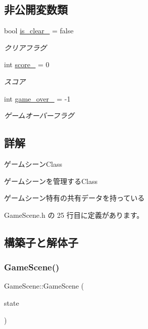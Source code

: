 \subsection*{非公開変数類}
\begin{DoxyCompactItemize}
\item 
bool \mbox{\hyperlink{class_game_scene_a48cf67b81c80718df80ee03aa6e73e74}{is\+\_\+clear\+\_\+}} = false
\begin{DoxyCompactList}\small\item\em クリアフラグ \end{DoxyCompactList}\item 
int \mbox{\hyperlink{class_game_scene_afe49ee089b9ad8415f7ab432a3c554aa}{score\+\_\+}} = 0
\begin{DoxyCompactList}\small\item\em スコア \end{DoxyCompactList}\item 
int \mbox{\hyperlink{class_game_scene_a92b5476dc1536c43b604bef51cc36c70}{game\+\_\+over\+\_\+}} = -\/1
\begin{DoxyCompactList}\small\item\em ゲームオーバーフラグ \end{DoxyCompactList}\end{DoxyCompactItemize}


\subsection{詳解}
ゲームシーン\+Class 

ゲームシーンを管理する\+Class

ゲームシーン特有の共有データを持っている 

 Game\+Scene.\+h の 25 行目に定義があります。



\subsection{構築子と解体子}
\mbox{\label{class_game_scene_a25e9e82ce85255dac27cd6489751bd40}} 
\subsubsection{\texorpdfstring{Game\+Scene()}{GameScene()}}
{\footnotesize\ttfamily Game\+Scene\+::\+Game\+Scene (\begin{DoxyParamCaption}\item[{\mbox{\hyperlink{class_scene_base_1_1_state_base}{State\+Base}} $\ast$}]{state }\end{DoxyParamCaption})}



